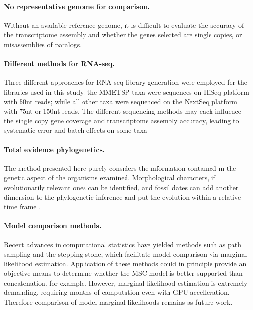 \documentclass[fleqn,10pt,lineno]{wlpeerj} %
\begin{document}
\paragraph*{No representative genome for comparison.} 
Without an available reference genome, it is difficult to evaluate the accuracy of the transcriptome assembly and whether the genes selected are single copies, or misassemblies of paralogs.
\paragraph*{Different methods for RNA-seq.} 
Three different approaches for RNA-seq library generation were employed for the libraries used in this study, the MMETSP taxa were sequences on HiSeq platform with 50nt reads; while all other taxa were sequenced on the NextSeq platform with 75nt or 150nt reads. 
The different sequencing methods may each influence the single copy gene coverage and transcriptome assembly accuracy, leading to systematic error and batch effects on some taxa.
\paragraph*{Total evidence phylogenetics.}
The method presented here purely considers the information contained in the genetic aspect of the organisms examined. 
Morphological characters, if evolutionarily relevant ones can be identified, and fossil dates can add another dimension to the phylogenetic inference and put the evolution within a relative time frame \citep{gavryushkina2017bayesian}.  
\paragraph*{Model comparison methods.}
Recent advances in computational statistics have yielded methods such as path sampling and the stepping stone, which facilitate model comparison via marginal likelihood estimation. 
Application of these methods could in principle provide an objective means to determine whether the MSC model is better supported than concatenation, for example.
However, marginal likelihood estimation is extremely demanding, requiring months of computation even with GPU accelleration.
Therefore comparison of model marginal likelihoods remains as future work.
\end{document}
